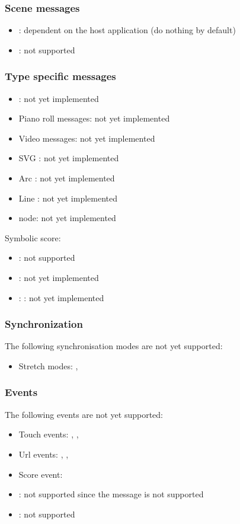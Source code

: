 \documentclass[a4paper,twoside]{article}
\newcommand{\subsublevel}[1]	{\subsubsection{#1}}
\begin{document}
\subsublevel{Scene messages}
\label{websceneMessages}

\begin{itemize}
\item {}: dependent on the host application (do nothing by default)
\item {} : not supported
\end{itemize}

\subsublevel{Type specific messages}
\label{webtypesMessages}

\begin{itemize}
\item {}: not yet implemented
\item Piano roll messages: not yet implemented
\item Video  messages: not yet implemented
\item SVG : not yet implemented
\item Arc : not yet implemented
\item Line : not yet implemented
\item {} node: not yet implemented
\end{itemize}

Symbolic score:
\begin{itemize}
\item {} : not supported
\item {}: not yet implemented
\item {}:  : not yet implemented
\end{itemize}

\subsublevel{Synchronization}
\label{webSynchronization}

The following synchronisation modes are not yet supported:
\begin{itemize}
\item Stretch modes: , 
\end{itemize}

\subsublevel{Events}
\label{webEvents}

The following events are not yet supported:
\begin{itemize}
\item Touch events: , , 
\item Url events: , , 
\item Score event: 
\item {}: not supported since the  message is not supported
\item {}: not supported
\end{itemize}
\end{document}
